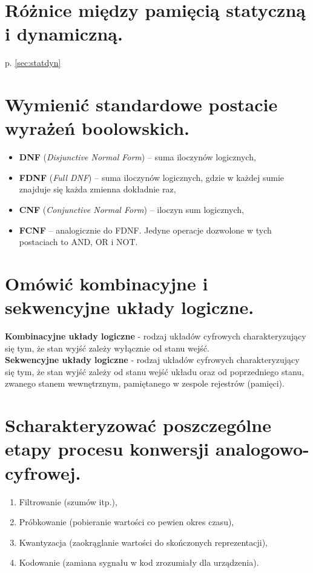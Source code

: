 \documentclass[12pt,a4paper]{article}
\begin{document}
	\section{Różnice między pamięcią statyczną i dynamiczną.}
	p. \ref{sec:statdyn}

	\section{Wymienić standardowe postacie wyrażeń boolowskich.}
	\begin{itemize}
		\item \textbf{DNF} (\textit{Disjunctive Normal Form}) -- suma iloczynów logicznych,
		\item \textbf{FDNF} (\textit{Full DNF}) -- suma iloczynów logicznych, gdzie w każdej sumie znajduje się każda zmienna dokładnie raz,
		\item \textbf{CNF} (\textit{Conjunctive Normal Form}) -- iloczyn sum logicznych,
		\item \textbf{FCNF} -- analogicznie do FDNF. Jedyne operacje dozwolone w tych postaciach to AND, OR i NOT.
	\end{itemize}

	\section{Omówić kombinacyjne i sekwencyjne układy logiczne.}
	\textbf{Kombinacyjne układy logiczne} - rodzaj układów cyfrowych charakteryzujący się tym, że stan wyjść zależy wyłącznie od stanu wejść.\\
	\textbf{Sekwencyjne układy logiczne} - rodzaj układów cyfrowych charakteryzujący się tym, że stan wyjść zależy od stanu wejść układu oraz od poprzedniego stanu, zwanego stanem wewnętrznym, pamiętanego w zespole rejestrów (pamięci).

	\section{Scharakteryzować poszczególne etapy procesu konwersji analogowo-cyfrowej.}
	\begin{enumerate}
		\item Filtrowanie (szumów itp.),
		\item Próbkowanie (pobieranie wartości co pewien okres czasu),
		\item Kwantyzacja (zaokrąglanie wartości do skończonych reprezentacji),
		\item Kodowanie (zamiana sygnału w kod zrozumiały dla urządzenia).
	\end{enumerate}
\end{document}
